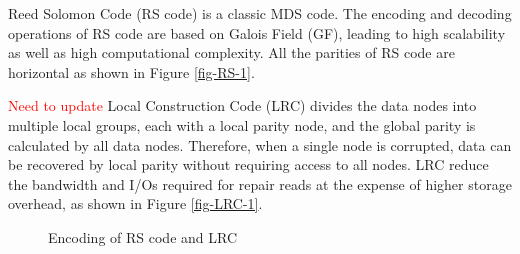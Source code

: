 \documentclass[sigconf]{acmart}
\begin{document}
Reed Solomon Code \cite{RS} (RS code) is a classic MDS code. The encoding and decoding operations of RS code are based on Galois Field (GF), leading to high scalability as well as high computational complexity. All the parities of RS code are horizontal as shown in Figure \ref{fig-RS-1}.

\textcolor{red}{Need to update}
Local Construction Code (LRC) \cite{LRC} divides the data nodes into multiple local groups, each with a local parity node, and the global parity is calculated by all data nodes. Therefore, when a single node is corrupted, data can be recovered by local parity without requiring access to all nodes.
LRC reduce the bandwidth and I/Os required for repair reads at the expense of higher storage overhead, as shown in Figure \ref{fig-LRC-1}.

\begin{figure}
    \centering
    \hspace{3px}
    \caption{Encoding of RS code and LRC}
\end{figure}
\end{document}
